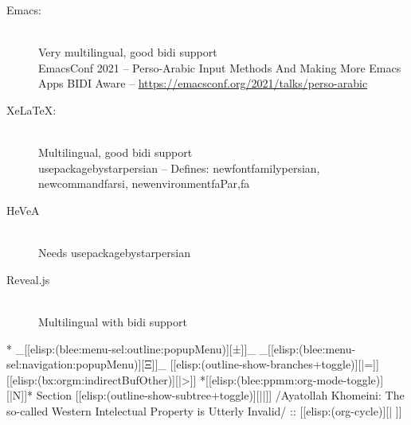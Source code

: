 \begin{whenOrg}
\begin{verblatex}
\begin{frame}[fragile,plain,label=persoArabic]
    \begin{description}
      \item[Emacs:]   \hfill \\
        Very multilingual, good bidi support\\
        EmacsConf 2021 -- Perso-Arabic Input Methods And Making More Emacs Apps BIDI Aware -- \url{https://emacsconf.org/2021/talks/perso-arabic}
      \item[XeLaTeX:]   \hfill \\
        Multilingual, good bidi support\\
        usepackage{bystarpersian}  -- Defines: newfontfamily{persian}, newcommand{farsi}, newenvironment{faPar},{fa}
      \item[HeVeA]   \hfill \\
        Needs usepackage{bystarpersian}
      \item[Reveal.js]   \hfill \\
        Multilingual with bidi support\\
    \end{description}



\end{frame}
\end{verblatex}


\begin{whenOrg}
*  _[[elisp:(blee:menu-sel:outline:popupMenu)][±]]_ _[[elisp:(blee:menu-sel:navigation:popupMenu)][Ξ]]_ [[elisp:(outline-show-branches+toggle)][|=]] [[elisp:(bx:orgm:indirectBufOther)][|>]] *[[elisp:(blee:ppmm:org-mode-toggle)][|N]]*  Section    [[elisp:(outline-show-subtree+toggle)][||]]   /Ayatollah Khomeini: The so-called Western Intelectual Property is Utterly Invalid/ ::  [[elisp:(org-cycle)][| ]]
\end{whenOrg}


\end{whenOrg}
